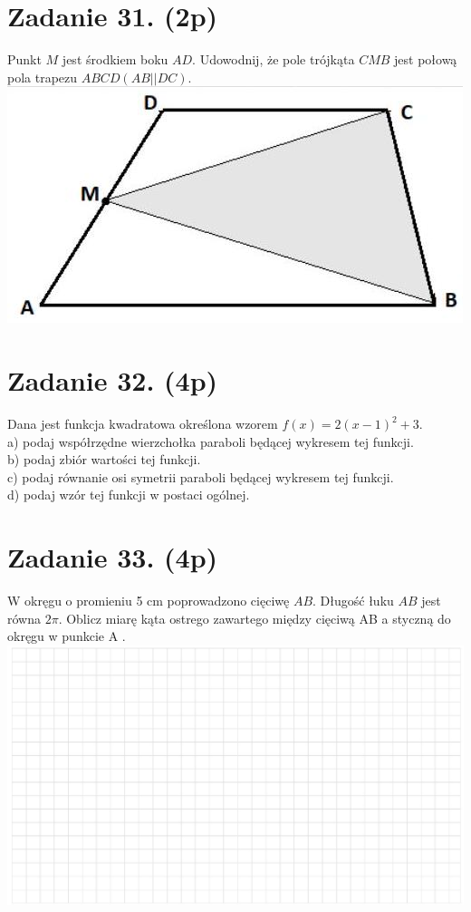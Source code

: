 \documentclass[10pt]{article}
\begin{document}
\section*{Zadanie 31. (2p)}
Punkt \(M\) jest środkiem boku \(A D\). Udowodnij, że pole trójkąta \(C M B\) jest połową pola trapezu \(A B C D(A B|\mid D C)\).\\
\includegraphics[max width=\textwidth, center]{2024_11_21_eef8bdc8380ba249dbe1g-09}

\section*{Zadanie 32. (4p)}
Dana jest funkcja kwadratowa określona wzorem \(f(x)=2(x-1)^{2}+3\).\\
a) podaj współrzędne wierzchołka paraboli będącej wykresem tej funkcji.\\
b) podaj zbiór wartości tej funkcji.\\
c) podaj równanie osi symetrii paraboli będącej wykresem tej funkcji.\\
d) podaj wzór tej funkcji w postaci ogólnej.

\section*{Zadanie 33. (4p)}
W okręgu o promieniu 5 cm poprowadzono cięciwę \(A B\). Długość łuku \(A B\) jest równa \(2 \pi\). Oblicz miarę kąta ostrego zawartego między cięciwą AB a styczną do okręgu w punkcie A .\\
\includegraphics[max width=\textwidth, center]{2024_11_21_eef8bdc8380ba249dbe1g-10}
\end{document}
